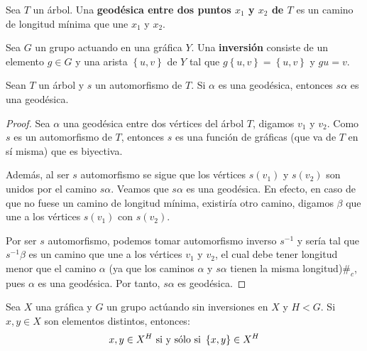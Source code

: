 \documentclass[12pt]{report}
\newcounter{it}
\theoremstyle{largebreak}
\newcommand\contradiction{\ensuremath{\#_c}}
\begin{document}
    \begin{mydef}
        Sea $T$ un árbol. Una \textbf{geodésica entre dos puntos $x_1$ y $x_2$ de $T$} es un camino de longitud mínima que une $x_1$ y $x_2$.
    \end{mydef}

    \begin{mydef}
        Sea $G$ un grupo actuando en una gráfica $Y$. Una \textbf{inversión} consiste de un elemento $g\in G$ y una arista $\left\{u,v \right\}$ de $Y$ tal que $g\left\{u,v\right\}=\left\{u,v \right\}$ y $gu=v$.
    \end{mydef}

    \begin{excer}
        Sean $T$ un árbol y $s$ un automorfismo de $T$. Si $\alpha$ es una geodésica, entonces $s\alpha$ es una geodésica.
    \end{excer}

    \begin{proof}
        Sea $\alpha$ una geodésica entre dos vértices del árbol $T$, digamos $v_1$ y $v_2$. Como $s$ es un automorfismo de $T$, entonces $s$ es una función de gráficas (que va de $T$ en sí misma) que es biyectiva.
        
        Además, al ser $s$ automorfismo se sigue que los vértices $s(v_1)$ y $s(v_2)$ son unidos por el camino $s\alpha$. Veamos que $s\alpha$ es una geodésica. En efecto, en caso de que no fuese un camino de longitud mínima, existiría otro camino, digamos $\beta$ que une a los vértices $s(v_1)$ con $s(v_2)$.

        Por ser $s$ automorfismo, podemos tomar automorfismo inverso $s^{-1}$ y sería tal que $s^{-1}\beta$ es un camino que une a los vértices $v_1$ y $v_2$, el cual debe tener longitud menor que el camino $\alpha$ (ya que los caminos $\alpha$ y $s\alpha$ tienen la misma longitud)\contradiction, pues $\alpha$ es una geodésica. Por tanto, $s\alpha$ es geodésica.
    \end{proof}

    \begin{propo}
        Sea $X$ una gráfica y $G$ un grupo actúando sin inversiones en $X$ y $H<G$. Si $x,y\in X$ son elementos distintos, entonces:
        \begin{equation*}
            x,y\in X^H\textup{ si y sólo si }\left\{x,y \right\}\in X^H
        \end{equation*} 
    \end{propo}
\end{document}
